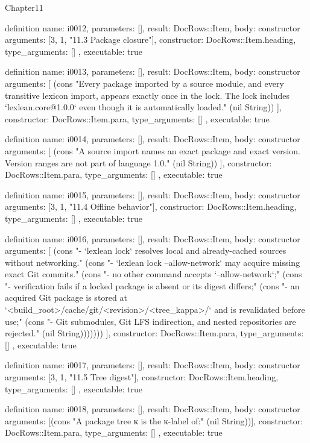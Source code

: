 \begin{lexlean}{Chapter11}
\begin{semanticmodule}
definition{
  name: i0012,
  parameters: [],
  result: DocRows::Item,
  body: constructor{
    arguments: [3, 1, "11.3 Package closure"],
    constructor: DocRows::Item.heading,
    type_arguments: []
  },
  executable: true
}

definition{
  name: i0013,
  parameters: [],
  result: DocRows::Item,
  body: constructor{
    arguments: [
      (cons "Every package imported by a source module, and every transitive lexicon import, appears exactly once in the lock. The lock includes `lexlean.core@1.0.0` even though it is automatically loaded." (nil String))
    ],
    constructor: DocRows::Item.para,
    type_arguments: []
  },
  executable: true
}

definition{
  name: i0014,
  parameters: [],
  result: DocRows::Item,
  body: constructor{
    arguments: [
      (cons "A source import names an exact package and exact version. Version ranges are not part of language 1.0." (nil String))
    ],
    constructor: DocRows::Item.para,
    type_arguments: []
  },
  executable: true
}

definition{
  name: i0015,
  parameters: [],
  result: DocRows::Item,
  body: constructor{
    arguments: [3, 1, "11.4 Offline behavior"],
    constructor: DocRows::Item.heading,
    type_arguments: []
  },
  executable: true
}

definition{
  name: i0016,
  parameters: [],
  result: DocRows::Item,
  body: constructor{
    arguments: [
      (cons "- `lexlean lock` resolves local and already-cached sources without networking." (cons "- `lexlean lock --allow-network` may acquire missing exact Git commits." (cons "- no other command accepts `--allow-network`;" (cons "- verification fails if a locked package is absent or its digest differs;" (cons "- an acquired Git package is stored at `<build_root>/cache/git/<revision>/<tree_kappa>/` and is revalidated before use;" (cons "- Git submodules, Git LFS indirection, and nested repositories are rejected." (nil String)))))))
    ],
    constructor: DocRows::Item.para,
    type_arguments: []
  },
  executable: true
}

definition{
  name: i0017,
  parameters: [],
  result: DocRows::Item,
  body: constructor{
    arguments: [3, 1, "11.5 Tree digest"],
    constructor: DocRows::Item.heading,
    type_arguments: []
  },
  executable: true
}

definition{
  name: i0018,
  parameters: [],
  result: DocRows::Item,
  body: constructor{
    arguments: [(cons "A package tree κ is the κ-label of:" (nil String))],
    constructor: DocRows::Item.para,
    type_arguments: []
  },
  executable: true
}


\end{semanticmodule}
\end{lexlean}
